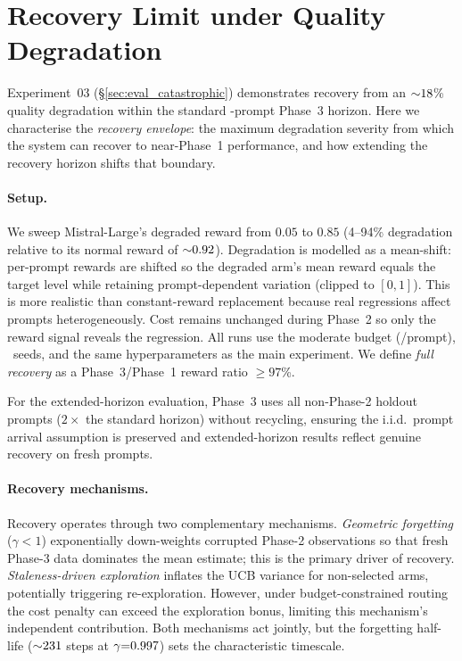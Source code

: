 \section{Recovery Limit under Quality Degradation}
\label{appendix:recovery_limit}

Experiment~03 (\S\ref{sec:eval_catastrophic}) demonstrates recovery from an ${\sim}18$\% quality degradation within the standard \rlPhaseN-prompt Phase~3 horizon.  Here we characterise the \emph{recovery envelope}: the maximum degradation severity from which the system can recover to near-Phase~1 performance, and how extending the recovery horizon shifts that boundary.

\paragraph{Setup.}
We sweep Mistral-Large's degraded reward from $0.05$ to $0.85$ (4--94\% degradation relative to its normal reward of ${\sim}0.92$).  Degradation is modelled as a mean-shift: per-prompt rewards are shifted so the degraded arm's mean reward equals the target level while retaining prompt-dependent variation (clipped to $[0,1]$).  This is more realistic than constant-reward replacement because real regressions affect prompts heterogeneously.  Cost remains unchanged during Phase~2 so only the reward signal reveals the regression.  All runs use the moderate budget (\rlBudgetTarget/prompt), \rlNseeds~seeds, and the same hyperparameters as the main experiment.  We define \emph{full recovery} as a Phase~3/Phase~1 reward ratio ${\geq}97$\%.

For the extended-horizon evaluation, Phase~3 uses all non-Phase-2 holdout prompts ($2{\times}$ the standard horizon) without recycling, ensuring the i.i.d.\ prompt arrival assumption is preserved and extended-horizon results reflect genuine recovery on fresh prompts.

\paragraph{Recovery mechanisms.}
Recovery operates through two complementary mechanisms.  \emph{Geometric forgetting} ($\gamma{<}1$) exponentially down-weights corrupted Phase-2 observations so that fresh Phase-3 data dominates the mean estimate; this is the primary driver of recovery.  \emph{Staleness-driven exploration} inflates the UCB variance for non-selected arms, potentially triggering re-exploration.  However, under budget-constrained routing the cost penalty can exceed the exploration bonus, limiting this mechanism's independent contribution.  Both mechanisms act jointly, but the forgetting half-life (${\sim}231$ steps at $\gamma{=}0.997$) sets the characteristic timescale.

